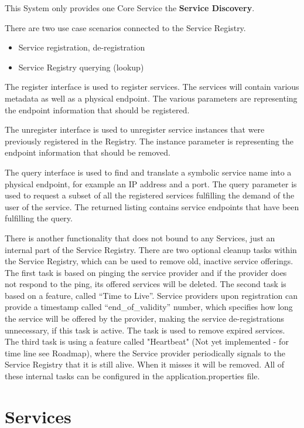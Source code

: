\documentclass[a4paper]{arrowhead}
\begin{document}
This System only provides one Core Service the \textbf{Service
  Discovery}. 


There are two use case scenarios connected to the Service Registry.
\begin{itemize}
    \item Service registration, de-registration
    \item Service Registry querying (lookup)
\end{itemize}

The register interface is used to register services. The services will contain various metadata as well as a physical endpoint. The various parameters are representing the endpoint information that should be registered.

The unregister interface is used to unregister service instances that were previously registered in the Registry. The instance parameter is representing the endpoint information that should be removed.

The query interface is used to find and translate a symbolic service name into a physical endpoint, for example an IP address and a port. The query parameter is used to request a subset of all the registered services fulfilling the demand of the user of the service. The returned listing contains service endpoints that have been fulfilling the query.

There is another functionality that does not bound to any Services,
just an internal part of the Service Registry. There are two optional
cleanup tasks within the Service Registry, which can be used to remove
old, inactive service offerings. The first task is based on pinging
the service provider and if the provider does not respond to the ping,
its offered services will be deleted. The second task is based on a
feature, called “Time to Live”. Service providers upon registration
can provide a timestamp called “end\_of\_validity” number, which
specifies how long the service will be offered by the provider, making
the service de-registrations unnecessary, if this task is active. The
task is used to remove expired services. The third task is using a
feature called "Heartbeat" (Not yet implemented - for time line see Roadmap), where the Service provider periodically signals to the Service Registry that it is still alive. When it misses it will be removed. All of these internal tasks can be configured in the application.properties file.

\section{Services}
\label{sec:services}
\end{document}
